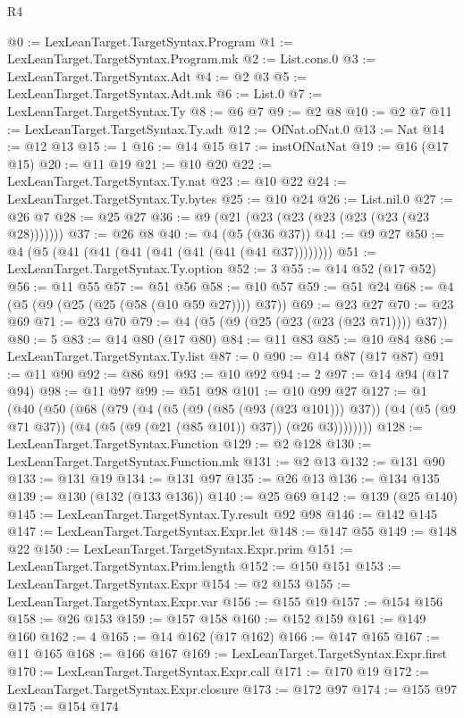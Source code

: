 \begin{lexlean}{R4}
\begin{coremodule}
@0 := LexLeanTarget.TargetSyntax.Program
@1 := LexLeanTarget.TargetSyntax.Program.mk
@2 := List.cons.{0}
@3 := LexLeanTarget.TargetSyntax.Adt
@4 := @2 @3
@5 := LexLeanTarget.TargetSyntax.Adt.mk
@6 := List.{0}
@7 := LexLeanTarget.TargetSyntax.Ty
@8 := @6 @7
@9 := @2 @8
@10 := @2 @7
@11 := LexLeanTarget.TargetSyntax.Ty.adt
@12 := OfNat.ofNat.{0}
@13 := Nat
@14 := @12 @13
@15 := 1
@16 := @14 @15
@17 := instOfNatNat
@19 := @16 (@17 @15)
@20 := @11 @19
@21 := @10 @20
@22 := LexLeanTarget.TargetSyntax.Ty.nat
@23 := @10 @22
@24 := LexLeanTarget.TargetSyntax.Ty.bytes
@25 := @10 @24
@26 := List.nil.{0}
@27 := @26 @7
@28 := @25 @27
@36 := @9 (@21 (@23 (@23 (@23 (@23 (@23 (@23 @28)))))))
@37 := @26 @8
@40 := @4 (@5 (@36 @37))
@41 := @9 @27
@50 := @4 (@5 (@41 (@41 (@41 (@41 (@41 (@41 (@41 @37))))))))
@51 := LexLeanTarget.TargetSyntax.Ty.option
@52 := 3
@55 := @14 @52 (@17 @52)
@56 := @11 @55
@57 := @51 @56
@58 := @10 @57
@59 := @51 @24
@68 := @4 (@5 (@9 (@25 (@25 (@58 (@10 @59 @27)))) @37))
@69 := @23 @27
@70 := @23 @69
@71 := @23 @70
@79 := @4 (@5 (@9 (@25 (@23 (@23 (@23 @71)))) @37))
@80 := 5
@83 := @14 @80 (@17 @80)
@84 := @11 @83
@85 := @10 @84
@86 := LexLeanTarget.TargetSyntax.Ty.list
@87 := 0
@90 := @14 @87 (@17 @87)
@91 := @11 @90
@92 := @86 @91
@93 := @10 @92
@94 := 2
@97 := @14 @94 (@17 @94)
@98 := @11 @97
@99 := @51 @98
@101 := @10 @99 @27
@127 := @1
    (@40
      (@50
        (@68
          (@79
            (@4
              (@5 (@9 (@85 (@93 (@23 @101))) @37))
              (@4 (@5 (@9 @71 @37)) (@4 (@5 (@9 (@21 (@85 @101)) @37)) (@26 @3))))))))
@128 := LexLeanTarget.TargetSyntax.Function
@129 := @2 @128
@130 := LexLeanTarget.TargetSyntax.Function.mk
@131 := @2 @13
@132 := @131 @90
@133 := @131 @19
@134 := @131 @97
@135 := @26 @13
@136 := @134 @135
@139 := @130 (@132 (@133 @136))
@140 := @25 @69
@142 := @139 (@25 @140)
@145 := LexLeanTarget.TargetSyntax.Ty.result @92 @98
@146 := @142 @145
@147 := LexLeanTarget.TargetSyntax.Expr.let
@148 := @147 @55
@149 := @148 @22
@150 := LexLeanTarget.TargetSyntax.Expr.prim
@151 := LexLeanTarget.TargetSyntax.Prim.length
@152 := @150 @151
@153 := LexLeanTarget.TargetSyntax.Expr
@154 := @2 @153
@155 := LexLeanTarget.TargetSyntax.Expr.var
@156 := @155 @19
@157 := @154 @156
@158 := @26 @153
@159 := @157 @158
@160 := @152 @159
@161 := @149 @160
@162 := 4
@165 := @14 @162 (@17 @162)
@166 := @147 @165
@167 := @11 @165
@168 := @166 @167
@169 := LexLeanTarget.TargetSyntax.Expr.first
@170 := LexLeanTarget.TargetSyntax.Expr.call
@171 := @170 @19
@172 := LexLeanTarget.TargetSyntax.Expr.closure
@173 := @172 @97
@174 := @155 @97
@175 := @154 @174

\end{coremodule}
\end{lexlean}

